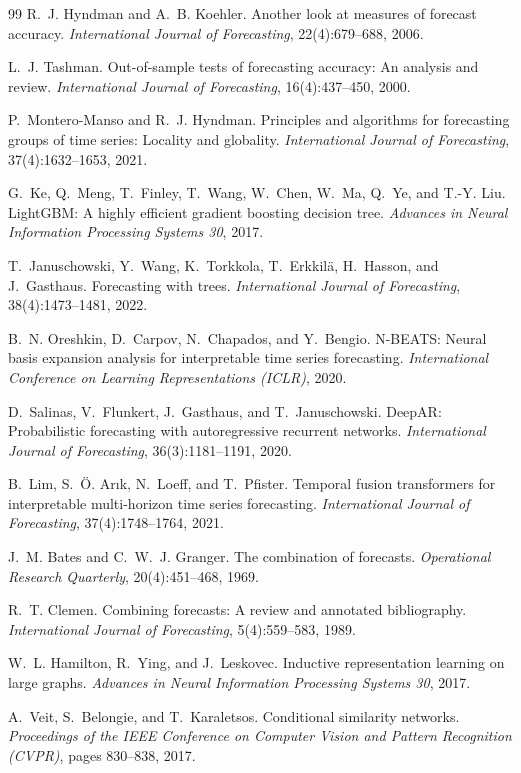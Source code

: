 \begin{thebibliography}{99}
 R.~J. Hyndman and A.~B. Koehler. Another look at measures of forecast accuracy. \emph{International Journal of Forecasting}, 22(4):679--688, 2006.

 L.~J. Tashman. Out-of-sample tests of forecasting accuracy: An analysis and review. \emph{International Journal of Forecasting}, 16(4):437--450, 2000.

 P.~Montero-Manso and R.~J. Hyndman. Principles and algorithms for forecasting groups of time series: Locality and globality. \emph{International Journal of Forecasting}, 37(4):1632--1653, 2021.

 G.~Ke, Q.~Meng, T.~Finley, T.~Wang, W.~Chen, W.~Ma, Q.~Ye, and T.-Y. Liu. LightGBM: A highly efficient gradient boosting decision tree. \emph{Advances in Neural Information Processing Systems 30}, 2017.

 T.~Januschowski, Y.~Wang, K.~Torkkola, T.~Erkkil\"a, H.~Hasson, and J.~Gasthaus. Forecasting with trees. \emph{International Journal of Forecasting}, 38(4):1473--1481, 2022.

 B.~N. Oreshkin, D.~Carpov, N.~Chapados, and Y.~Bengio. N-BEATS: Neural basis expansion analysis for interpretable time series forecasting. \emph{International Conference on Learning Representations (ICLR)}, 2020.

 D.~Salinas, V.~Flunkert, J.~Gasthaus, and T.~Januschowski. DeepAR: Probabilistic forecasting with autoregressive recurrent networks. \emph{International Journal of Forecasting}, 36(3):1181--1191, 2020.

 B.~Lim, S.~\"O. Ar{\i}k, N.~Loeff, and T.~Pfister. Temporal fusion transformers for interpretable multi-horizon time series forecasting. \emph{International Journal of Forecasting}, 37(4):1748--1764, 2021.

 J.~M. Bates and C.~W.~J. Granger. The combination of forecasts. \emph{Operational Research Quarterly}, 20(4):451--468, 1969.

 R.~T. Clemen. Combining forecasts: A review and annotated bibliography. \emph{International Journal of Forecasting}, 5(4):559--583, 1989.

 W.~L. Hamilton, R.~Ying, and J.~Leskovec. Inductive representation learning on large graphs. \emph{Advances in Neural Information Processing Systems 30}, 2017.

 A.~Veit, S.~Belongie, and T.~Karaletsos. Conditional similarity networks. \emph{Proceedings of the IEEE Conference on Computer Vision and Pattern Recognition (CVPR)}, pages 830--838, 2017.


\end{thebibliography}
